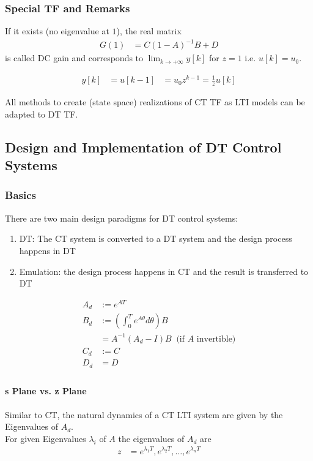 \subsubsection{Special TF and Remarks}

If it exists (no eigenvalue at $1$), the real matrix
\noindent\begin{align*}
    G(1) & =C(1-A)^{-1}B+D
\end{align*}
is called DC gain and corresponds to $\lim_{k\to+\infty}y[k]$ for $z=1$ i.e. $u[k]=u_0$.\\
%

\noindent\begin{align*}
    y[k] & =u[k-1] & =u_0z^{k-1}=\frac1zu[k]
\end{align*}

All methods to create (state space) realizations of CT TF as LTI models can be adapted to DT TF.
%
%
\newpage
\subsection{Design and Implementation of DT Control Systems}
\subsubsection{Basics}
There are two main design paradigms for DT control systems:
\begin{enumerate}
    \item DT: The CT system is converted to a DT system and the design process happens in DT
    \item Emulation: the design process happens in CT and the result is transferred to DT
\end{enumerate}

\noindent\begin{align*}
    A_d & :=e^{AT}                                                   \\
    B_d & :=\left(\int_0^T {e^{A\theta}}d\theta\right)B              \\
        & = A^{-1}\left(A_d-I\right)B\;\; \text{(if $A$ invertible)} \\
    C_d & :=C                                                        \\
    D_d & =D                                                         \\
\end{align*}
\paragraph{s Plane vs. z Plane}
Similar to CT, the natural dynamics of a CT LTI system are given by the Eigenvalues of $A_d$.\\
For given Eigenvalues $\lambda_i$ of $A$ the eigenvalues of $A_d$ are
\noindent\begin{align*}
    z & =e^{\lambda_1T},e^{\lambda_2T},\ldots,e^{\lambda_nT}
\end{align*}

